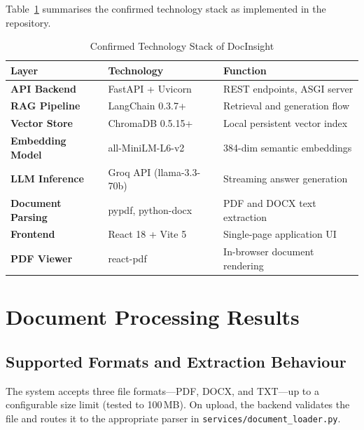 Table~\ref{tab:tech_stack} summarises the confirmed technology stack as implemented
in the repository.

\begin{table}[H]
\centering
\caption{Confirmed Technology Stack of DocInsight}
\label{tab:tech_stack}
\renewcommand{\arraystretch}{1.35}
\begin{tabular}{>{\bfseries}p{3.2cm} p{4.5cm} p{5.5cm}}
\toprule
\textbf{Layer} & \textbf{Technology} & \textbf{Function} \\
\midrule
API Backend      & FastAPI + Uvicorn          & REST endpoints, ASGI server \\
RAG Pipeline     & LangChain 0.3.7+           & Retrieval and generation flow \\
Vector Store     & ChromaDB 0.5.15+           & Local persistent vector index \\
Embedding Model  & all-MiniLM-L6-v2           & 384-dim semantic embeddings \\
LLM Inference    & Groq API (llama-3.3-70b)   & Streaming answer generation \\
Document Parsing & pypdf, python-docx         & PDF and DOCX text extraction \\
Frontend         & React 18 + Vite 5          & Single-page application UI \\
PDF Viewer       & react-pdf                  & In-browser document rendering \\
\bottomrule
\end{tabular}
\end{table}

\section{Document Processing Results}

\subsection{Supported Formats and Extraction Behaviour}

The system accepts three file formats---PDF, DOCX, and TXT---up to a
configurable size limit (tested to 100\,MB). On upload, the backend validates
the file and routes it to the appropriate parser in
\texttt{services/document\_loader.py}.

